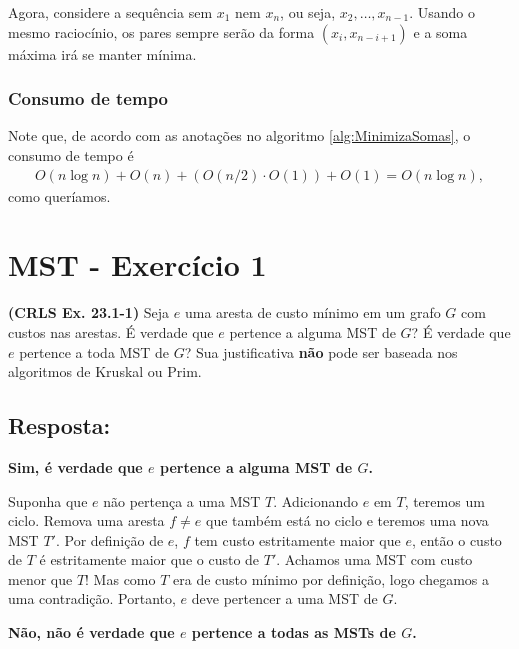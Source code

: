 \documentclass{article}
\begin{document}
Agora, considere a sequência sem $x_1$ nem $x_n$, ou seja, $x_2, \dots, x_{n-1}$. Usando o mesmo raciocínio, os pares sempre serão da forma $(x_i,x_{n-i+1})$ e a soma máxima irá se manter mínima.

\subsubsection*{Consumo de tempo}
Note que, de acordo com as anotações no algoritmo \ref*{alg:MinimizaSomas}, o consumo de tempo é
\begin{align*}
  O(n\log n) + O(n) + (O(n/2) \cdot O(1)) + O(1) = O(n \log n) ,
\end{align*}
como queríamos.

\newpage

\section*{MST - Exercício 1}
\textbf{(CRLS Ex. 23.1-1)} Seja $e$ uma aresta de custo mínimo em um grafo $G$ com custos nas arestas. É verdade que $e$ pertence a alguma MST de $G$? É verdade que $e$ pertence a toda MST de $G$? Sua justificativa \textbf{não} pode ser baseada nos algoritmos de Kruskal ou Prim.

\bigskip

\subsection*{Resposta:}
\textbf{Sim, é verdade que $e$ pertence a alguma MST de $G$.}

Suponha que $e$ não pertença a uma MST $T$. Adicionando $e$ em $T$, teremos um ciclo. Remova uma aresta $f \neq e$ que também está no ciclo e teremos uma nova MST $T'$. Por definição de $e$, $f$ tem custo estritamente maior que $e$, então o custo de $T$ é estritamente maior que o custo de $T'$. Achamos uma MST com custo menor que $T$! Mas como $T$ era de custo mínimo por definição, logo chegamos a uma contradição. Portanto, $e$ deve pertencer a uma MST de $G$.

\bigskip

\textbf{Não, não é verdade que $e$ pertence a todas as MSTs de $G$.}
\end{document}

